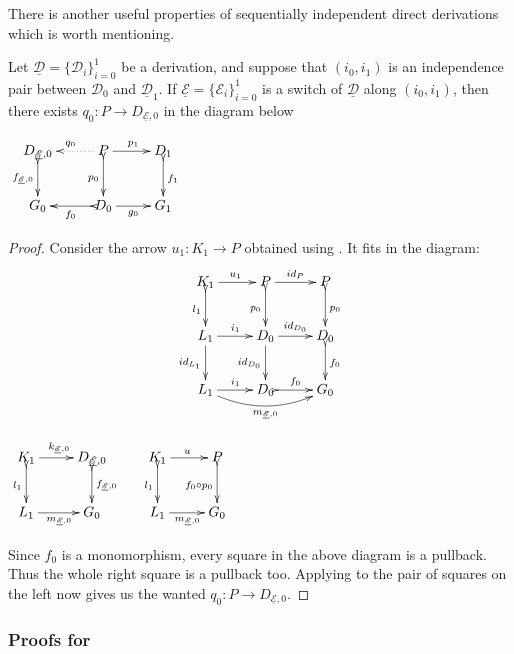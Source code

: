 \documentclass[a4paper,UKenglish,cleveref,pdftex,thm-restate,numberwithinsect,anonymous]{lipics}
\newcommand{\id}[1]{\mathsf{id}_{#1}}
\newcommand{\dder}[1]{\mathscr{#1}}
\newcommand{\der}[1]{\underline{\dder{#1}}}
\begin{document}
There is another
useful properties of  sequentially independent direct
derivations which is worth mentioning.

\noindent
\parbox{9.5cm}
{\begin{proposition}\label{lem:cose}Let
    $\der{D}=\{\dder{D}_i\}_{i=0}^1$ be a derivation, and suppose
    that $(i_0, i_1)$ is an independence pair between $\dder{D}_0$
    and $\der{D}_1$.  If $\der{E}=\{\dder{E}_i\}_{i=0}^1$ is a
    switch of $\der{D}$ along $(i_0, i_1)$, then there exists
    $q_0\colon P\to D_{\der{E},0}$ in the diagram
    below \end{proposition}}
\parbox{4cm}{$\xymatrix{D_{\der{E},0} \ar@{>->}[d]_{f_{\der{E},0}}&P
    \ar@{.>}[l]_{q_0} \ar[r]^{p_1} \ar@{>->}[d]_{p_0}& D_1
    \ar@{>->}[d]^{f_1}\\ G_{0}&D_0 \ar@{>->}[l]^{f_0}\ar[r]_{g_0}&
    G_1}$}

\begin{proof}
  Consider the arrow $u_1\colon K_1\to P$ obtained using
  . It fits in the diagram:
\[		\xymatrix{K_1 \ar[r]^{u_1} \ar@{>->}[d]_{l_1}&P
	\ar[r]^{\id{P}}\ar@{>->}[d]_{p_0}& P\ar@{>->}[d]^{p_0}\\L_1
	\ar[d]_{\id{L_1}}\ar[r]^{i_1}&D_0 \ar[r]^{\id{D_0}}
	\ar[d]_{\id{D_0}}& D_{0} \ar@{>->}[d]^{f_0}\\
	L_1\ar[r]^{i_1} \ar@/_.4cm/[rr]_{m_{\der{E},0}}&D_0
	\ar@{>->}[r]^{f_0}&G_0}\]

\smallskip \noindent 
  \parbox{4cm}{$\xymatrix{K_1 \ar@{>->}[d]_{l_1}\ar[r]^{k_{\der{E},0}}&
  		D_{\der{E},0} \ar@{>->}[d]^{f_{\der{E},0}} & K_1 \ar[r]^{u}
  		\ar@{>->}[d]_{l_1}& P \ar@{>->}[d]_{f_0\circ
  			p_0}\\L_1\ar[r]_{m_{\der{E},0}}&G_0 &L_1
  		\ar[r]_{m_{\der{E},0}}&G_0} $}\hspace{2cm}
  	\parbox{8cm}{\hspace{15pt} Since $f_0$ is a monomorphism, every square in the above diagram
  is a pullback. Thus the whole right square is a pullback too.
  Applying  to the pair of squares on the left now gives
  us the wanted $q_0\colon P\to D_{\der{E},0}$. \qedhere}
  
\end{proof}


\subsubsection{Proofs for }
\end{document}
